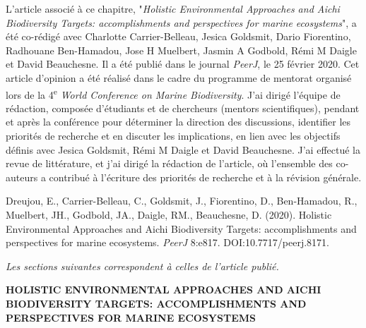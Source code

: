 L'article associé à ce chapitre, "\textit{Holistic Environmental Approaches and Aichi Biodiversity Targets: accomplishments and perspectives for marine ecosystems}", a été co-rédigé avec Charlotte Carrier-Belleau, Jesica Goldsmit, Dario Fiorentino, Radhouane Ben-Hamadou, Jose H Muelbert, Jasmin A Godbold, Rémi M Daigle et David Beauchesne. Il a été publié dans le journal \textit{PeerJ}, le 25 février 2020. Cet article d'opinion a été réalisé dans le cadre du programme de mentorat organisé lors de la 4\textsuperscript{e} \textit{World Conference on Marine Biodiversity}. J'ai dirigé l'équipe de rédaction, composée d'étudiants et de chercheurs (mentors scientifiques), pendant et après la conférence pour déterminer la direction des discussions, identifier les priorités de recherche et en discuter les implications, en lien avec les objectifs définis avec Jesica Goldsmit, Rémi M Daigle et David Beauchesne. J'ai effectué la revue de littérature, et j'ai dirigé la rédaction de l'article, où l'ensemble des co-auteurs a contribué à l'écriture des priorités de recherche et à la révision générale. \linebreak[4]

\begin{singlespace}
Dreujou, E., Carrier-Belleau, C., Goldsmit, J., Fiorentino, D., Ben-Hamadou, R., Muelbert, JH., Godbold, JA., Daigle, RM., Beauchesne, D. (2020). Holistic Environmental Approaches and Aichi Biodiversity Targets: accomplishments and perspectives for marine ecosystems. \textit{PeerJ} 8:e817. DOI:10.7717/peerj.8171.
\end{singlespace}

\textit{Les sections suivantes correspondent à celles de l'article publié.}

\clearpage

\begin{center}
\textbf{HOLISTIC ENVIRONMENTAL APPROACHES AND AICHI BIODIVERSITY TARGETS: ACCOMPLISHMENTS AND PERSPECTIVES FOR MARINE ECOSYSTEMS}
\end{center}
